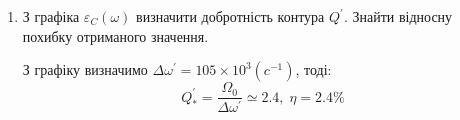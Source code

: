\documentclass[a4paper, 12pt]{article}
\begin{document}
\begin{enumerate}
    \item З графіка $\varepsilon_C(\omega)$ визначити добротність контура $Q^{'}$.
    Знайти відносну похибку отриманого значення.

    З графіку визначимо $\Delta \omega^{'} = 105 \times 10^3(c^{-1})$, тоді:
    $$ Q_*^{'} = \frac{\Omega_0}{\Delta \omega^{'}} \simeq 2.4 ,\; \eta = 2.4\%$$


\end{enumerate}
\end{document}
